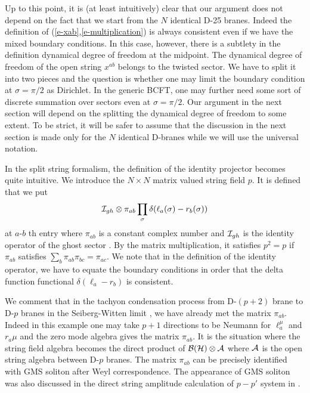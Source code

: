 \documentclass[a4paper,12pt]{article}
\begin{document}
Up to this point, it is (at least intuitively) clear 
that our argument does not depend on the fact that we start from the 
$N$ identical D-25 branes.  Indeed the definition of
(\ref{e-xab},\ref{e-multiplication}) 
is always consistent even if we have the mixed boundary
conditions.
In this case, however, there is a subtlety in the definition
dynamical degree of freedom at the midpoint.  The dynamical
degree of freedom of the open string $x^{ab}$ belongs to the
twisted sector. We have to split it into two pieces and the question
is whether one may limit the boundary condition at $\sigma=\pi/2$ 
as Dirichlet.  In the generic BCFT, one may further need some
sort of discrete summation over sectors even at $\sigma=\pi/2$. 
Our argument in the next section will depend on the splitting
the dynamical degree of freedom to some extent.  To be strict,
it will be safer to assume that the discussion in the next section 
is made only for the $N$ identical D-branes while we will use
the universal notation.

In the split string formalism, the definition
of the identity projector becomes quite
intuitive.  We introduce the $N\times N$ 
matrix valued string field $p$. It is defined that we put
\begin{equation}
{\cal I}_{gh}\otimes \pi_{ab}\prod_\sigma\delta(\ell_a(\sigma)-r_b(\sigma))
\end{equation}
at $a$-$b$ th entry where $\pi_{ab}$ is a constant complex number
and ${\cal I}_{gh}$ is the identity operator of the ghost sector
\cite{r-AAB, r-GT2}.  By the matrix multiplication, it satisfies
$p^2=p$ if $\pi_{ab}$ satisfies $\sum_b\pi_{ab}\pi_{bc}=\pi_{ac}$.
We note that in the definition of the identity
operator, we have to equate the boundary conditions
in order that the delta function functional $\delta(\ell_a-r_b)$
is consistent.

We comment that in the tachyon condensation process from D-$(p+2)$ brane
to D-$p$ branes \cite{r-HKLM, r-Witten2} 
in the Seiberg-Witten limit \cite{r-SW}, we have already met
the matrix $\pi_{ab}$.  Indeed in this example one may take
$p+1$ directions to be Neumann for $\ell_a^\mu$ and $r_a\mu$
and the zero mode algebra gives the matrix $\pi_{ab}$.
It is the situation where the string field algebra
becomes the direct product of $\cal B(H)\otimes{\cal A}$
where ${\cal A}$ is the open string algebra between D-$p$ branes.
The matrix $\pi_{ab}$ can be precisely 
identified with GMS soliton \cite{r-Witten2} after
Weyl correspondence.  The appearance of GMS soliton
was also discussed in the direct string amplitude calculation
of $p-p'$ system in \cite{r-CIMM}.
\end{document}
